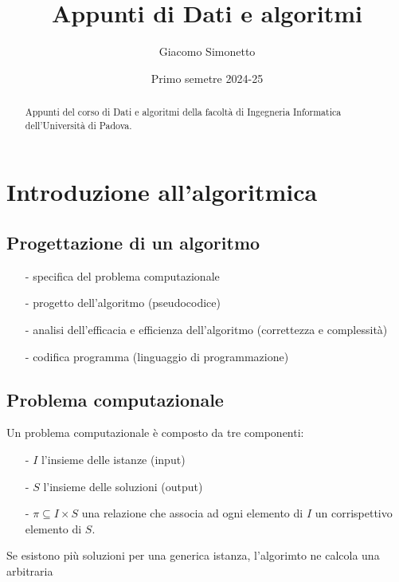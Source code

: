 \documentclass[a4paper]{article}
\title{Appunti di Dati e algoritmi}
\author{Giacomo Simonetto}
\date{Primo semetre 2024-25}
\begin{document}
\maketitle
\begin{abstract}
	Appunti del corso di Dati e algoritmi della facoltà di Ingegneria Informatica dell'Università di Padova.
\end{abstract}

\newpage

\tableofcontents

\newpage

\section{Introduzione all'algoritmica}
\subsection{Progettazione di un algoritmo}
\begin{itemize}[topsep=3pt, itemsep=0pt]
	\item[-] specifica del problema computazionale
	\item[-] progetto dell'algoritmo (pseudocodice)
	\item[-] analisi dell'efficacia e efficienza dell'algoritmo (correttezza e complessità)
	\item[-] codifica programma (linguaggio di programmazione)
\end{itemize}


\subsection{Problema computazionale}
Un problema computazionale è composto da tre componenti:
\begin{itemize}[topsep=3pt, itemsep=0pt]
	\item[-] \(I\) l'insieme delle istanze (input)
	\item[-] \(S\) l'insieme delle soluzioni (output)
	\item[-] \(\pi \subseteq I \times S\) una relazione che associa ad ogni elemento di \(I\) un corrispettivo elemento di \(S\).
\end{itemize}
Se esistono più soluzioni per una generica istanza, l'algorimto ne calcola una arbitraria
\end{document}
